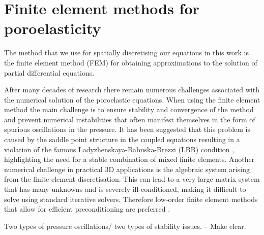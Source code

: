 \section{Finite element methods for poroelasticity}
The method that we use for spatially discretising our equations in this work is the finite element method (FEM) for obtaining approximations to the solution of partial differential equations.

After many decades of research there remain numerous challenges associated with the numerical solution of the poroelastic equations. When using the finite element method the main challenge is to ensure stability and convergence of the method and prevent numerical instabilities that often manifest themselves in the form of spurious oscillations in the pressure. It has been suggested that this problem is caused by the saddle point structure in the coupled equations resulting in a violation of the famous Ladyzhenskaya-Babuska-Brezzi (LBB) condition \citep{haga2012causes}, highlighting the need for a stable combination of mixed finite elements. Another numerical challenge in practical 3D applications is the algebraic system arising from the finite element discretisation. This can lead to a very large matrix system that has many unknowns and is severely ill-conditioned, making it difficult to solve using standard iterative solvers. Therefore low-order finite element methods that allow for efficient preconditioning are preferred \citep{white2011block,ferronato2010fully}.



Two types of pressure oscillations/ two types of stability issues. -- Make clear.


